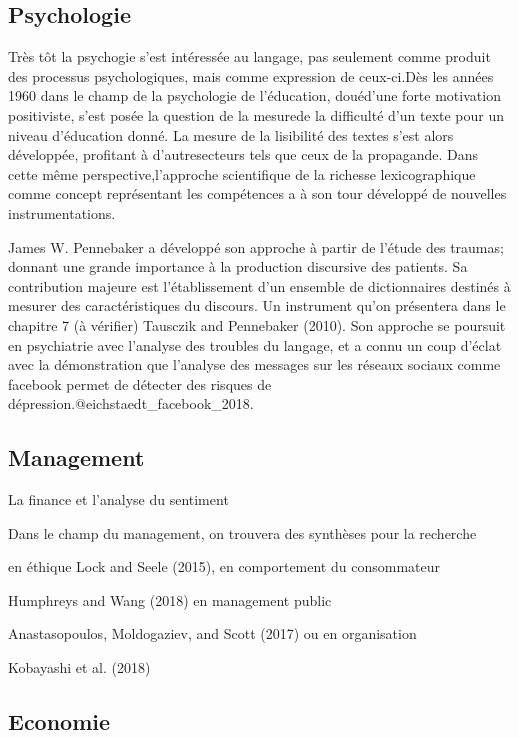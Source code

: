 \documentclass[
  letterpaper,
  DIV=11,
  numbers=noendperiod]{scrreprt}
\begin{document}
\subsection{Psychologie}\label{psychologie}

Très tôt la psychogie s'est intéressée au langage, pas seulement comme
produit des processus psychologiques, mais comme expression de
ceux-ci.Dès les années 1960 dans le champ de la psychologie de
l'éducation, douéd'une forte motivation positiviste, s'est posée la
question de la mesurede la difficulté d'un texte pour un niveau
d'éducation donné. La mesure de la lisibilité des textes s'est alors
développée, profitant à d'autresecteurs tels que ceux de la propagande.
Dans cette même perspective,l'approche scientifique de la richesse
lexicographique comme concept représentant les compétences a à son tour
développé de nouvelles instrumentations.

James W. Pennebaker a développé son approche à partir de l'étude des
traumas; donnant une grande importance à la production discursive des
patients. Sa contribution majeure est l'établissement d'un ensemble de
dictionnaires destinés à mesurer des caractéristiques du discours. Un
instrument qu'on présentera dans le chapitre 7 (à vérifier) Tausczik and
Pennebaker (2010). Son approche se poursuit en psychiatrie avec
l'analyse des troubles du langage, et a connu un coup d'éclat avec la
démonstration que l'analyse des messages sur les réseaux sociaux comme
facebook permet de détecter des risques de
dépression.@eichstaedt\_facebook\_2018.

\subsection{Management}\label{management}

La finance et l'analyse du sentiment

Dans le champ du management, on trouvera des synthèses pour la recherche

en éthique Lock and Seele (2015), en comportement du consommateur

Humphreys and Wang (2018) en management public

Anastasopoulos, Moldogaziev, and Scott (2017) ou en organisation

Kobayashi et al. (2018)

\subsection{Economie}\label{economie}
\end{document}
